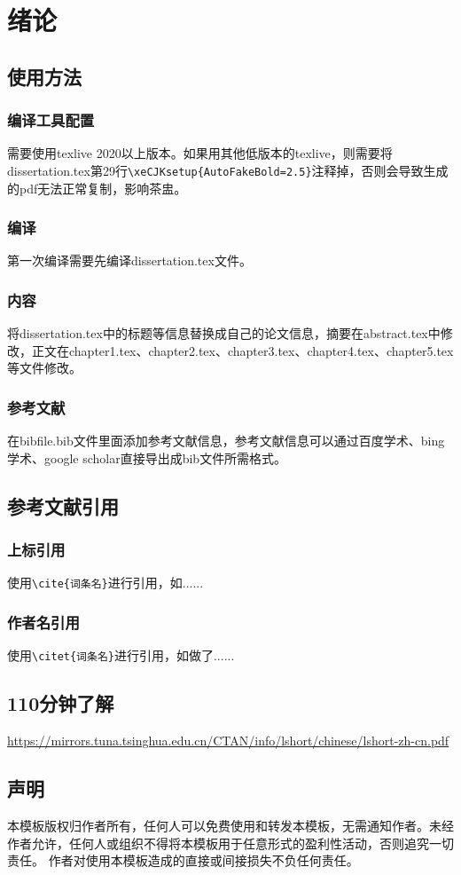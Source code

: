 \chapter{绪论}
\section{使用方法}
\subsection{编译工具配置}
需要使用texlive 2020以上版本。如果用其他低版本的texlive，则需要将dissertation.tex第29行\verb|\xeCJKsetup{AutoFakeBold=2.5}|注释掉，否则会导致生成的pdf无法正常复制，影响茶盅。

\subsection{编译}
第一次编译需要先编译dissertation.tex文件。

\subsection{内容}
将dissertation.tex中的标题等信息替换成自己的论文信息，摘要在abstract.tex中修改，正文在chapter1.tex、chapter2.tex、chapter3.tex、chapter4.tex、chapter5.tex等文件修改。

\subsection{参考文献}
在bibfile.bib文件里面添加参考文献信息，参考文献信息可以通过百度学术、bing学术、google scholar直接导出成bib文件所需格式。

\section{参考文献引用}
\subsection{上标引用}
使用\verb|\cite{词条名}|进行引用，如\cite{hofmann2006physical}......

\subsection{作者名引用}
使用\verb|\citet{词条名}|进行引用，如\citet{blakely1996potential}做了......

\section{110分钟了解\LaTeXe}
\href{https://mirrors.tuna.tsinghua.edu.cn/CTAN/info/lshort/chinese/lshort-zh-cn.pdf}{https://mirrors.tuna.tsinghua.edu.cn/CTAN/info/lshort/chinese/lshort-zh-cn.pdf}

\section{声明}
本模板版权归作者所有，任何人可以免费使用和转发本模板，无需通知作者。未经作者允许，任何人或组织不得将本模板用于任意形式的盈利性活动，否则追究一切责任。
作者对使用本模板造成的直接或间接损失不负任何责任。
